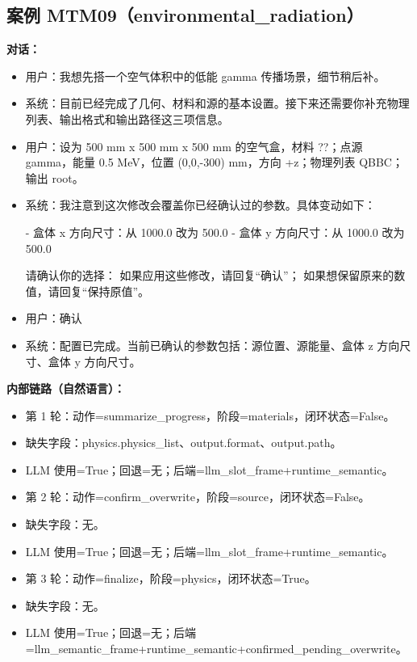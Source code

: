\documentclass[11pt]{ctexart}
\begin{document}
\subsection{案例 MTM09（environmental\_radiation）}
\textbf{对话：}
\begin{itemize}
\item 用户：我想先搭一个空气体积中的低能 gamma 传播场景，细节稍后补。
\item 系统：目前已经完成了几何、材料和源的基本设置。接下来还需要你补充物理列表、输出格式和输出路径这三项信息。
\item 用户：设为 500 mm x 500 mm x 500 mm 的空气盒，材料 ??；点源 gamma，能量 0.5 MeV，位置 (0,0,-300) mm，方向 +z；物理列表 QBBC；输出 root。
\item 系统：我注意到这次修改会覆盖你已经确认过的参数。具体变动如下：

- 盒体 x 方向尺寸：从 1000.0 改为 500.0
- 盒体 y 方向尺寸：从 1000.0 改为 500.0

请确认你的选择：
如果应用这些修改，请回复“确认”；
如果想保留原来的数值，请回复“保持原值”。
\item 用户：确认
\item 系统：配置已完成。当前已确认的参数包括：源位置、源能量、盒体 z 方向尺寸、盒体 y 方向尺寸。
\end{itemize}
\textbf{内部链路（自然语言）：}
\begin{itemize}
\item 第 1 轮：动作=summarize\_progress，阶段=materials，闭环状态=False。
\item 缺失字段：physics.physics\_list、output.format、output.path。
\item LLM 使用=True；回退=无；后端=llm\_slot\_frame+runtime\_semantic。
\item 第 2 轮：动作=confirm\_overwrite，阶段=source，闭环状态=False。
\item 缺失字段：无。
\item LLM 使用=True；回退=无；后端=llm\_slot\_frame+runtime\_semantic。
\item 第 3 轮：动作=finalize，阶段=physics，闭环状态=True。
\item 缺失字段：无。
\item LLM 使用=True；回退=无；后端=llm\_semantic\_frame+runtime\_semantic+confirmed\_pending\_overwrite。
\end{itemize}
\end{document}
